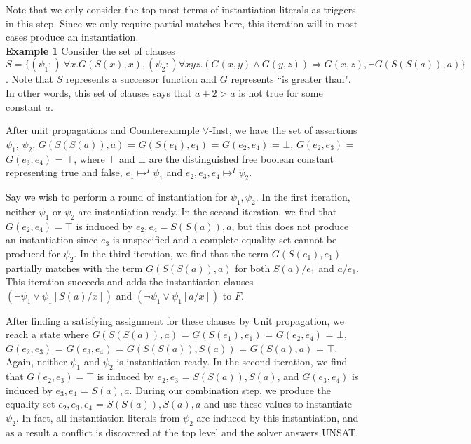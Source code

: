 \documentclass{llncs}
\begin{document}
Note that we only consider the top-most terms of instantiation literals as triggers in this step.
Since we only require partial matches here, this iteration will in most cases produce an instantiation. \\

{\bf Example 1}
Consider the set of clauses $S = \{ (\psi_1 :) \ \forall x. G( S( x ), x), (\psi_2 :) \forall xyz. (G(x,y) \wedge G(y,z)) \Rightarrow G(x,z), \neg G( S(S(a)), a) \}$.
Note that $S$ represents a successor function and $G$ represents ``is greater than".  
In other words, this set of clauses says that $a + 2 > a$ is not true for some constant $a$.

After unit propagations and Counterexample $\forall$-Inst, we have the set of assertions $\psi_1$, $\psi_2$, $G( S(S(a)), a)$ = $G( S(e_1), e_1)$ = $G( e_2, e_4 )$ = $\bot$, $G( e_2, e_3 )$ = $G( e_3, e_4 )$ = $\top$, where $\top$ and $\bot$ are the distinguished free boolean constant representing true and false, $e_1 \mapsto^I \psi_1$ and $e_2, e_3, e_4 \mapsto^I \psi_2$.

Say we wish to perform a round of instantiation for $\psi_1, \psi_2$.
In the first iteration, neither $\psi_1$ or $\psi_2$ are instantiation ready.
In the second iteration, we find that $G( e_2, e_4 ) = \top$ is induced by $e_2, e_4 = S(S(a)), a$, but this does not produce an instantiation since $e_3$ is unspecified and a complete equality set cannot be produced for $\psi_2$.
In the third iteration, we find that the term $G( S(e_1), e_1)$ partially matches with the term $G( S(S(a)), a)$ for both $S(a)/e_1$ and $a/e_1$.
This iteration succeeds and adds the instantiation clauses $( \neg \psi_1 \vee \psi_1[S(a)/x])$ and $( \neg \psi_1 \vee \psi_1[a/x])$ to $F$.

After finding a satisfying assignment for these clauses by Unit propagation, we reach a state where $G( S(S(a)), a)$ = $G( S(e_1), e_1)$ = $G( e_2, e_4 )$ = $\bot$, $G( e_2, e_3 )$ = $G( e_3, e_4 )$ = $G(S(S(a)), S(a))$ = $G( S(a), a)$ = $\top$.
Again, neither $\psi_1$ and $\psi_2$ is instantiation ready.
In the second iteration, we find that $G( e_2, e_3 ) = \top$ is induced by $e_2,e_3$ = $S(S(a)), S(a)$, and $G( e_3, e_4 )$ is induced by $e_3, e_4$ = $S(a), a$.
During our combination step, we produce the equality set $e_2, e_3, e_4$ = $S(S(a)), S(a), a$ and use these values to instantiate $\psi_2$.
In fact, all instantiation literals from $\psi_2$ are induced by this instantiation, and as a result a conflict is discovered at the top level and the solver answers UNSAT.
\end{document}
